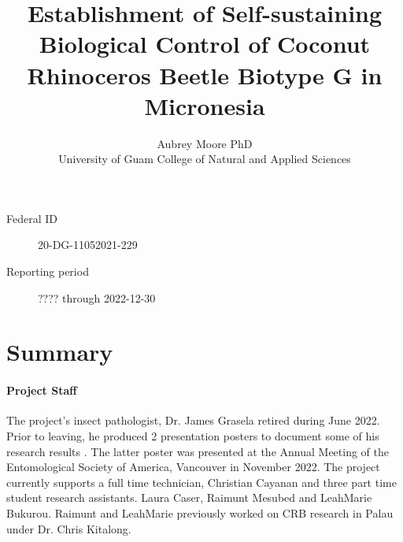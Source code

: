 \documentclass[12pt,letterpaper,english,bibliography=totocnumbered, abstract=on]{scrartcl}
\begin{document}
\titlehead{Final Report: USFS 20-DG-11052021-229}

\title{Establishment of Self-sustaining Biological Control of Coconut Rhinoceros Beetle Biotype G in Micronesia }

\author{Aubrey Moore PhD\\University of Guam College of Natural and Applied Sciences}


\maketitle

\begin{description}
	\item[Federal ID] 20-DG-11052021-229
	\item[Reporting period] ???? through 2022-12-30
\end{description}


\begin{footnotesize}	
\end{footnotesize}

\clearpage

\tableofcontents

\clearpage

\section*{Summary}
\noindent
	
\paragraph{Project Staff}
	The project's insect pathologist, Dr. James Grasela retired during June 2022. Prior to leaving, he produced 2 presentation posters to document some of his research results \cite{graselaPreliminaryDetectionWolbachia2022,graselaPreliminaryEffortsEstablish2022}. The latter poster was presented at the Annual Meeting of the Entomological Society of America, Vancouver in November 2022. The project currently supports a full time technician, Christian Cayanan and three part time student research assistants. Laura Caser, Raimunt Mesubed and LeahMarie Bukurou. Raimunt and LeahMarie previously worked on CRB research in Palau under Dr. Chris Kitalong.
	
\end{document}
